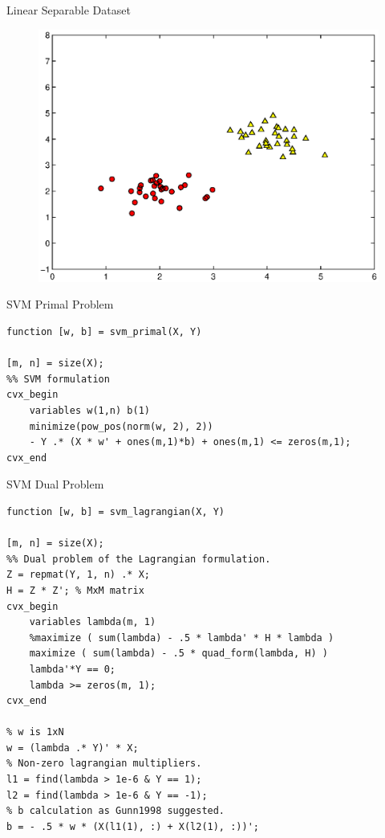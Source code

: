 \documentclass{beamer}
\begin{document}
\begin{frame}{Linear Separable Dataset}
    \begin{figure}[!htb]
        \centering
        \includegraphics[width=.9\textwidth]{figures/dataset.eps}
    \end{figure}
\end{frame}

\begin{frame}[fragile]{SVM Primal Problem}
    \begin{verbatim}
function [w, b] = svm_primal(X, Y)

[m, n] = size(X);
%% SVM formulation
cvx_begin
    variables w(1,n) b(1)
    minimize(pow_pos(norm(w, 2), 2))
    - Y .* (X * w' + ones(m,1)*b) + ones(m,1) <= zeros(m,1);
cvx_end
    \end{verbatim}
\end{frame}


\begin{frame}[fragile]{SVM Dual Problem}
    \begin{verbatim}
function [w, b] = svm_lagrangian(X, Y)

[m, n] = size(X);
%% Dual problem of the Lagrangian formulation.
Z = repmat(Y, 1, n) .* X;
H = Z * Z'; % MxM matrix
cvx_begin
    variables lambda(m, 1)
    %maximize ( sum(lambda) - .5 * lambda' * H * lambda )
    maximize ( sum(lambda) - .5 * quad_form(lambda, H) )
    lambda'*Y == 0;
    lambda >= zeros(m, 1);
cvx_end

% w is 1xN
w = (lambda .* Y)' * X;
% Non-zero lagrangian multipliers.
l1 = find(lambda > 1e-6 & Y == 1);
l2 = find(lambda > 1e-6 & Y == -1);
% b calculation as Gunn1998 suggested.
b = - .5 * w * (X(l1(1), :) + X(l2(1), :))';
    \end{verbatim}
\end{frame}
\end{document}
